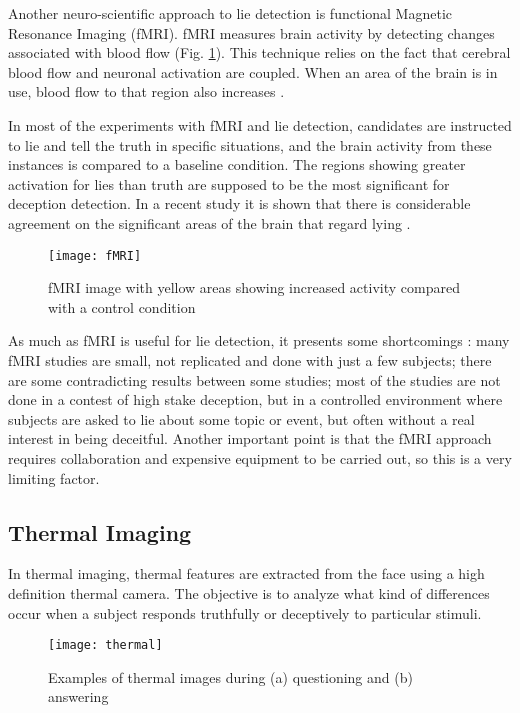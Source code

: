 Another neuro-scientific approach to lie detection is functional Magnetic Resonance Imaging (fMRI). fMRI measures brain activity by detecting changes associated with blood flow (Fig. \ref{fig:fMRI}). This technique relies on the fact that cerebral blood flow and neuronal activation are coupled. When an area of the brain is in use, blood flow to that region also increases \cite{WikifMRI}.

In most of the experiments with fMRI and lie detection, candidates are instructed to lie and tell the truth in specific situations, and the brain activity from these instances is compared to a baseline condition. The regions showing greater activation for lies than truth are supposed to be the most significant for deception detection. In a recent study it is shown that there is considerable agreement on the significant areas of the brain that regard lying \cite{fMRILD}.

\begin{figure}[H]
	\centering
	\texttt{[image: fMRI]}
	\caption{fMRI image with yellow areas showing increased activity compared with a control condition  \cite{WikifMRI}}
	\label{fig:fMRI}
\end{figure}

As much as fMRI is useful for lie detection, it presents some shortcomings \cite{fMRIDD} \cite{fMRIDA}: many fMRI studies are small, not replicated and done with just a few subjects; there are some contradicting results between some studies; most of the studies are not done in a contest of high stake deception, but in a controlled environment where subjects are asked to lie about some topic or event, but often without a real interest in being deceitful. Another important point is that the fMRI approach requires collaboration and expensive equipment to be carried out, so this is a very limiting factor.

\subsection{Thermal Imaging}
In thermal imaging, thermal features are extracted from the face using a high definition thermal camera. The objective is to analyze what kind of differences occur when a subject responds truthfully or deceptively to particular stimuli.

\begin{figure}[H]
	\centering
	\texttt{[image: thermal]}
	\caption{Examples of thermal images during (a) questioning and (b) answering \cite{6967765}}
\end{figure}

